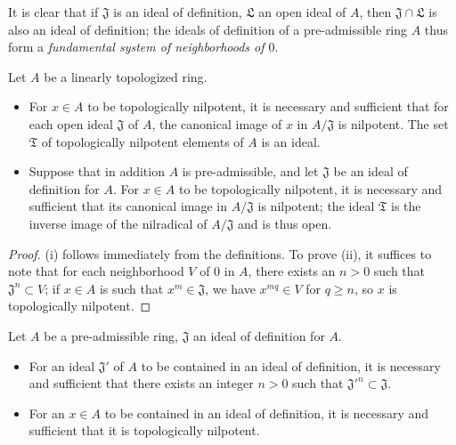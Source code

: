 It is clear that if $\mathfrak{J}$ is an ideal of definition, $\mathfrak{L}$ an open ideal of
$A$, then $\mathfrak{J}\cap\mathfrak{L}$ is also an ideal of definition; the ideals of
definition of a pre-admissible ring $A$ thus form a {\em fundamental system of neighborhoods
of $0$}.

\begin{lem}[7.1.3]
\label{lem-0.7.1.3}
Let $A$ be a linearly topologized ring.
\begin{itemize}
  \item[{\rm(i)}] For $x\in A$ to be topologically nilpotent, it is necessary and sufficient that for
    each open ideal $\mathfrak{J}$ of $A$, the canonical image of $x$ in $A/\mathfrak{J}$ is
    nilpotent. The set $\mathfrak{T}$ of topologically nilpotent elements of $A$ is an ideal.
  \item[{\rm(ii)}] Suppose that in addition $A$ is pre-admissible, and let $\mathfrak{J}$ be an ideal
     of definition for $A$. For $x\in A$ to be topologically nilpotent, it is necessary and
     sufficient that its canonical image in $A/\mathfrak{J}$ is nilpotent; the ideal
     $\mathfrak{T}$ is the inverse image of the nilradical of $A/\mathfrak{J}$ and is thus open.
\end{itemize}
\end{lem}

\begin{proof}
\label{proof-lem-0.7.1.3}
(i) follows immediately from the definitions. To prove (ii), it suffices to note that for
each neighborhood $V$ of $0$ in $A$, there exists an $n>0$ such that
$\mathfrak{J}^n\subset V$; if $x\in A$ is such that $x^m\in\mathfrak{J}$, we have
$x^{mq}\in V$ for $q\geqslant n$, so $x$ is topologically nilpotent.
\end{proof}

\begin{prop}[7.1.4]
\label{prop-0.7.1.4}
Let $A$ be a pre-admissible ring, $\mathfrak{J}$ an ideal of definition for $A$.
\begin{itemize}
  \item[{\rm(i)}] For an ideal $\mathfrak{J}'$ of $A$ to be contained in an ideal of
    definition, it is necessary and sufficient that there exists an integer
    $n>0$ such that ${\mathfrak{J}'}^n\subset\mathfrak{J}$.
  \item[{\rm(ii)}] For an $x\in A$ to be contained in an ideal of definition, it is
    necessary and sufficient that it is topologically nilpotent.
\end{itemize}
\end{prop}

